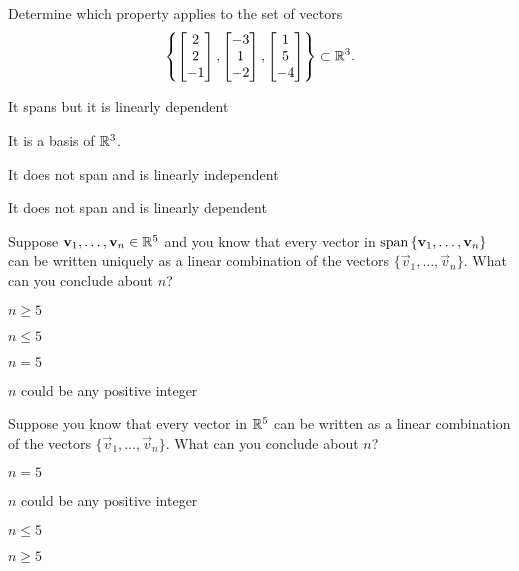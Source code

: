 \begin{readinessAssuranceTest}
\item Determine which property applies to the set of vectors $$\left\{ \begin{bmatrix}  2 \\ 2 \\ -1 \end{bmatrix}, \begin{bmatrix} -3 \\ 1 \\ -2 \end{bmatrix} , \begin{bmatrix} 1 \\ 5 \\ -4 \end{bmatrix}\right\}\subset \IR^3.$$
\begin{readinessAssuranceTestChoices}
\item It spans but it is linearly dependent
\item It is a basis of $\IR^3$.
\item It does not span and is linearly independent
\item It does not span and is linearly dependent %
\end{readinessAssuranceTestChoices}


\item Suppose $\vec{v}_1, \ldots, \vec{v}_n \in \IR^5$ and you know that every vector in ${\rm span} \left\{ \vec{v}_1, \ldots, \vec{v}_n\right\}$ can be written uniquely as a linear combination of the vectors $\{\vec{v}_1, \ldots, \vec{v}_n\}$.  What can you conclude about $n$?
\begin{readinessAssuranceTestChoices}
\item $n \geq 5$
\item $n \leq 5$
\item $n=5$
\item $n$ could be any positive integer
\end{readinessAssuranceTestChoices}

\item Suppose you know that every vector in $\IR^5$ can be written as a linear combination of the vectors $\{\vec{v}_1, \ldots, \vec{v}_n\}$.  What can you conclude about $n$?
\begin{readinessAssuranceTestChoices}
\item $n=5$
\item $n$ could be any positive integer
\item $n \leq 5$
\item $n \geq 5$
\end{readinessAssuranceTestChoices}


\end{readinessAssuranceTest}
